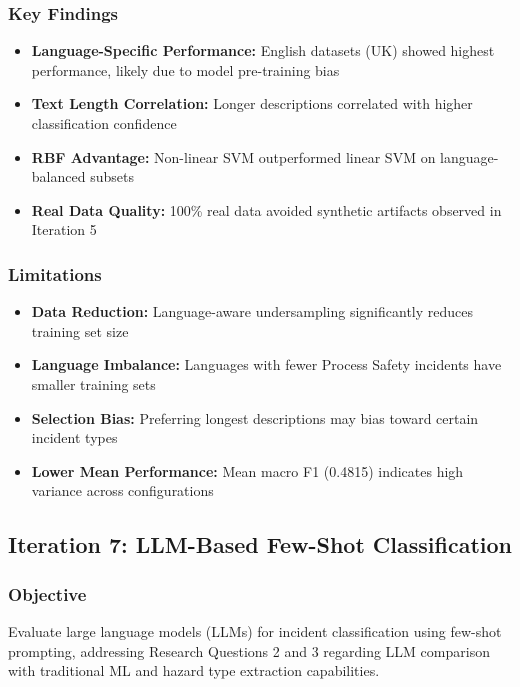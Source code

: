 \documentclass[11pt, titlepage, bibliography=totoc]{scrreprt}
\begin{document}
\subsubsection{Key Findings}

\begin{itemize}
    \item \textbf{Language-Specific Performance:} English datasets (UK) showed highest performance, likely due to model pre-training bias
    \item \textbf{Text Length Correlation:} Longer descriptions correlated with higher classification confidence
    \item \textbf{RBF Advantage:} Non-linear SVM outperformed linear SVM on language-balanced subsets
    \item \textbf{Real Data Quality:} 100\% real data avoided synthetic artifacts observed in Iteration 5
\end{itemize}

\subsubsection{Limitations}

\begin{itemize}
    \item \textbf{Data Reduction:} Language-aware undersampling significantly reduces training set size
    \item \textbf{Language Imbalance:} Languages with fewer Process Safety incidents have smaller training sets
    \item \textbf{Selection Bias:} Preferring longest descriptions may bias toward certain incident types
    \item \textbf{Lower Mean Performance:} Mean macro F1 (0.4815) indicates high variance across configurations
\end{itemize}

\subsection{Iteration 7: LLM-Based Few-Shot Classification}

\subsubsection{Objective}
Evaluate large language models (LLMs) for incident classification using few-shot prompting, addressing Research Questions 2 and 3 regarding LLM comparison with traditional ML and hazard type extraction capabilities.
\end{document}
